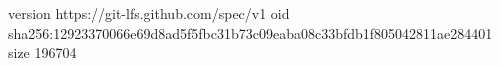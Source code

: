 version https://git-lfs.github.com/spec/v1
oid sha256:12923370066e69d8ad5f5fbc31b73c09eaba08c33bfdb1f805042811ae284401
size 196704
